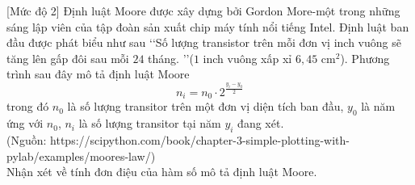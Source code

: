 \begin{bt}%
[Mức độ 2]%
	Định luật Moore được xây dựng bởi Gordon More-một trong những sáng lập viên của tập đoàn sản xuất chip máy tính nổi tiếng Intel. Định luật ban đầu được phát biểu như sau
	\lq\lq Số lượng transistor trên mỗi đơn vị inch vuông sẽ tăng lên gấp đôi sau mỗi $24$ tháng. \rq\rq ($1$ inch vuông xấp xỉ $6{,}45$ cm$^2$).
	Phương trình sau đây mô tả định luật Moore
	$$n_i=n_0\cdot 2^{\tfrac{y_i-y_0}{2}}$$
	trong đó $n_0$ là số lượng transitor trên một đơn vị diện tích ban đầu, $y_0$ là năm ứng với $n_0$, $n_i$ là số lượng transitor tại năm $y_i$ đang xét. \\
	(Nguồn: https://scipython.com/book/chapter-3-simple-plotting-with-pylab/examples/moores-law/)\\
	Nhận xét về tính đơn điệu của hàm số mô tả định luật Moore.
\end{bt}


